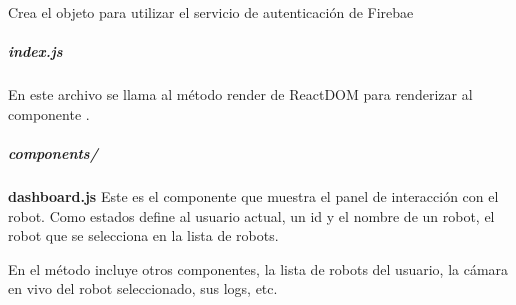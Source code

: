 
\begin{fulllineitems}
\label{\detokenize{code_docs:auth}}
Crea el objeto para utilizar el servicio de autenticación de Firebae

\end{fulllineitems}



\subparagraph{index.js}
\label{\detokenize{code_docs:index-js}}
En este archivo se llama al método render de ReactDOM para renderizar al
componente .


\subparagraph{components/}
\label{\detokenize{code_docs:components}}

\textbf{dashboard.js}
\label{\detokenize{code_docs:dashboard-js}}
Este es el componente que muestra el panel de interacción con el robot.
Como estados define al usuario actual, un id y el nombre de un robot, el robot
que se selecciona en la lista de robots.

En el método  incluye otros componentes, la lista de robots del
usuario, la cámara en vivo del robot seleccionado, sus logs, etc.

